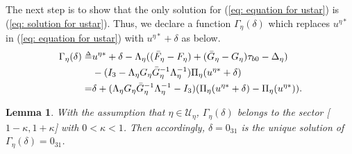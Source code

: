 \documentclass[letterpaper, 10 pt, conference]{ieeeconf}  %
\def\delequal{\mathrel{\ensurestackMath{\stackon[1pt]{=}{\scriptscriptstyle\Delta}}}}
\newtheorem{lemma}{Lemma}
\theoremstyle{definition}
\begin{document}
The next step is to show that the only solution for (\ref{eq: equation for ustar}) is (\ref{eq: solution for ustar}). Thus, we declare a function $\Gamma_{\eta}(\delta)$ which replaces $u^{\eta *}$ in (\ref{eq: equation for ustar}) with $u^{\eta *} + \delta$ as below.
\begin{equation*}
    \begin{split}
        \Gamma_{\eta}(\delta) \delequal& u^{\eta *} + \delta - \Lambda_{\eta}((\bar{F}_{\eta} - F_{\eta}) + (\bar{G}_{\eta} - G_{\eta})\tau_{b 0} - \Delta_{\eta}) \\&- (I_{3} - \Lambda_{\eta}G_{\eta}\bar{G}_{\eta}^{-1}\Lambda_{\eta}^{-1})\Pi_{\eta}(u^{\eta *}+\delta) \\ =& \delta + (\Lambda_{\eta}G_{\eta}\bar{G}_{\eta}^{-1}\Lambda_{\eta}^{-1} - I_3)(\Pi_{\eta}(u^{\eta *} + \delta ) - \Pi_{\eta}(u^{\eta *})).
    \end{split}
\end{equation*}

\begin{lemma} \label{lemma for the sector condition of Gamma}
With the assumption that $\eta \in \mathcal{U}_{\eta}$, $\Gamma_{\eta}(\delta)$ belongs to the sector [$1-\kappa, 1+ \kappa$] with $0 < \kappa < 1$. Then accordingly, $\delta = 0_{3 1}$ is the unique solution of $\Gamma_{\eta}(\delta) = 0_{3 1}$.
\end{lemma}
\end{document}

